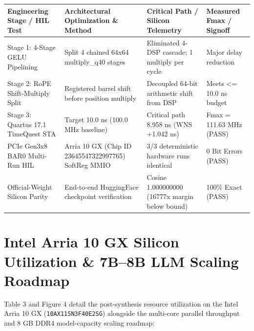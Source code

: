 \documentclass[11pt,a4paper]{article}
\begin{document}
{\footnotesize\renewcommand{\arraystretch}{1.14}\begin{longtable}{@{}L{0.23\textwidth}L{0.27\textwidth}L{0.24\textwidth}L{0.16\textwidth}@{}}\toprule

\textbf{Engineering Stage /\allowbreak{} HIL Test} & \textbf{Architectural Optimization \& Method} & \textbf{Critical Path /\allowbreak{} Silicon Telemetry} & \textbf{Measured Fmax /\allowbreak{} Signoff}\\\midrule\endhead

Stage 1: 4-Stage GELU Pipelining & Split 4 chained 64x64 multiply\_\allowbreak{}q40 stages & Eliminated 4-DSP cascade; 1 multiply per cycle & Major delay reduction\\[2pt]

Stage 2: RoPE Shift-Multiply Split & Registered barrel shift before position multiply & Decoupled 64-bit arithmetic shift from DSP & Meets <=\allowbreak{} 10.0 ns budget\\[2pt]

Stage 3: Quartus 17.1 TimeQuest STA & Target 10.0 ns (\allowbreak{}100.0 MHz baseline)\allowbreak{} & Critical path 8.958 ns (\allowbreak{}WNS +\allowbreak{}1.042 ns)\allowbreak{} & Fmax =\allowbreak{} 111.63 MHz (\allowbreak{}PASS)\allowbreak{}\\[2pt]

PCIe Gen3x8 BAR0 Multi-Run HIL & Arria 10 GX (\allowbreak{}Chip ID 23645547\allowbreak{}32299776\allowbreak{}5)\allowbreak{} SoftReg MMIO & 3/\allowbreak{}3 deterministic hardware runs identical & 0 Bit Errors (\allowbreak{}PASS)\allowbreak{}\\[2pt]

Official-Weight Silicon Parity & End-to-end HuggingFace checkpoint verification & Cosine 1.00000000\allowbreak{}0 (\allowbreak{}16777x margin below bound)\allowbreak{} & 100\% Exact (\allowbreak{}PASS)\allowbreak{}\\[2pt]

\bottomrule\end{longtable}}

\section{Intel Arria 10 GX Silicon Utilization \& 7B--8B LLM Scaling Roadmap}

Table 3 and Figure 4 detail the post-synthesis resource utilization on the Intel Arria 10 GX (\texttt{10AX115N3F40E2SG}) alongside the multi-core parallel throughput and 8 GB DDR4 model-capacity scaling roadmap:
\end{document}

